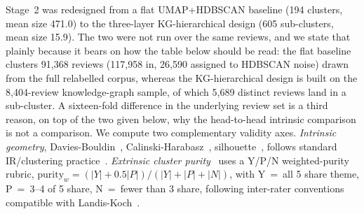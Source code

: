 \documentclass[preprint,12pt]{elsarticle}
\begin{document}
  Stage~2 was redesigned from a flat UMAP+HDBSCAN baseline (194 clusters, mean size 471.0) to the
   three-layer KG-hierarchical design (605 sub-clusters, mean size 15.9). The two were not run
   over the same reviews, and we state that plainly because it bears on how the table below should
   be read: the flat baseline clusters 91{,}368 reviews (117{,}958 in, 26{,}590 assigned to
   HDBSCAN noise) drawn from the full relabelled corpus, whereas the KG-hierarchical design is
   built on the 8{,}404-review knowledge-graph sample, of which 5{,}689 distinct reviews land in a
   sub-cluster. A sixteen-fold difference in the underlying review set is a third reason, on top
   of the two given below, why the head-to-head intrinsic comparison is not a comparison. We compute two
  complementary validity axes. \emph{Intrinsic geometry},
  Davies-Bouldin~\cite{davies1979cluster}, Calinski-Harabasz~\cite{calinski1974dendrite},
  silhouette~\cite{rousseeuw1987silhouettes}, follows standard IR/clustering
  practice~\cite{schutze2008introduction, steinbach2000comparison, strehl2002cluster}.
  \emph{Extrinsic cluster purity}~\cite{amigo2009comparison, schutze2008introduction} uses a
  Y/P/N weighted-purity rubric, $\mathrm{purity}_w = (|Y| + 0.5|P|)/(|Y|+|P|+|N|)$, with Y~=~all
   5 share theme, P~=~3--4 of 5 share, N~=~fewer than 3 share, following inter-rater conventions
   compatible with Landis-Koch~\cite{landis1977measurement}.
\end{document}
